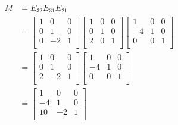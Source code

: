 \documentclass[12pt,letterpaper]{article}
\begin{document}
\begin{enumerate}
\begin{enumerate}
          \begin{align*}
            M
            &=
            E_{32}E_{31}E_{21}
            \\
            &=
            \begin{bmatrix}
              1  & 0  & 0 \\
              0  & 1  & 0 \\
              0  & -2 & 1 \\
            \end{bmatrix}
            \begin{bmatrix}
              1  & 0 & 0 \\
              0  & 1 & 0 \\
              2  & 0 & 1 \\
            \end{bmatrix}
            \begin{bmatrix}
              1  & 0 & 0 \\
              -4 & 1 & 0 \\
              0  & 0 & 1 \\
            \end{bmatrix}
            \\
            &=
            \begin{bmatrix}
              1  & 0  & 0 \\
              0  & 1  & 0 \\
              2  & -2 & 1 \\
            \end{bmatrix}
            \begin{bmatrix}
              1  & 0 & 0 \\
              -4 & 1 & 0 \\
              0  & 0 & 1 \\
            \end{bmatrix}
            \\
            &=
            \begin{bmatrix}
              1  & 0  & 0 \\
              -4 & 1  & 0 \\
              10 & -2 & 1 \\
            \end{bmatrix}
            \\
          \end{align*}


\end{enumerate}
\end{enumerate}
\end{document}
